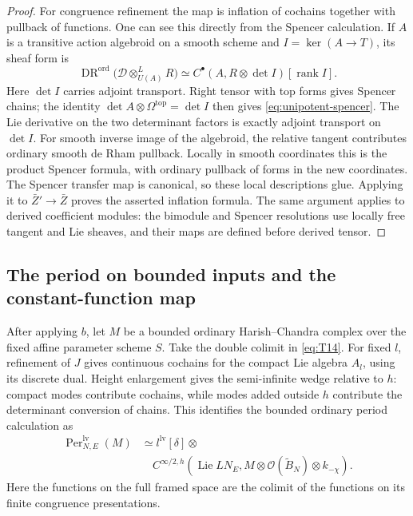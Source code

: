 \documentclass[11pt]{article}
\numberwithin{equation}{section}
\theoremstyle{definition}
\theoremstyle{remark}
\begin{document}
\begin{proof}
For congruence refinement the map is inflation of cochains together
with pullback of functions.  One can see this directly from the
Spencer calculation.  If $A$ is a transitive action algebroid on a
smooth scheme and $I=\ker(A\to T)$, its sheaf form is
\begin{equation}\label{eq:unipotent-spencer}
 \operatorname{DR}^{\mathrm{ord}}
   \bigl(\mathscr D\otimes^L_{U(A)}R\bigr)
 \simeq C^\bullet(A,R\otimes\det I)
                           [\operatorname{rank}I].
\end{equation}
Here $\det I$ carries adjoint transport.  Right tensor with top
forms gives Spencer chains; the identity
$\det A\otimes\Omega^{\mathrm{top}}=\det I$ then gives
\eqref{eq:unipotent-spencer}.  The Lie derivative on the two
determinant factors is exactly adjoint transport on $\det I$.
For smooth inverse image of the algebroid, the relative tangent
contributes ordinary smooth de Rham pullback.  Locally in smooth
coordinates this is the product Spencer formula, with ordinary
pullback of forms in the new coordinates.  The Spencer transfer
map is canonical, so these local descriptions glue.  Applying it
to $\bar Z'\to\bar Z$ proves the asserted inflation formula.
The same argument applies to derived coefficient modules: the
bimodule and Spencer resolutions use locally free tangent and Lie
sheaves, and their maps are defined before derived tensor.
\end{proof}

\subsection{The period on bounded inputs and the constant-function map}

After applying $b$, let $M$ be a bounded ordinary Harish--Chandra
complex over the fixed affine parameter scheme $S$.  Take the
double colimit in \eqref{eq:T14}.  For fixed $l$, refinement
of $J$ gives continuous cochains for the compact Lie algebra $A_l$,
using its discrete dual.  Height enlargement gives the semi-infinite
wedge relative to $h$: compact modes contribute cochains, while
modes added outside $h$ contribute the determinant conversion of
chains.  This identifies the bounded ordinary period calculation as
\begin{equation}\label{eq:unipotent-coefficient-period}
 \begin{aligned}
 \operatorname{Per}_{N,E}^{\mathrm{lv}}(M)
 &\simeq l^{\mathrm{lv}}[\delta]\otimes{}\\
 &\quad C^{\infty/2,h}\!\left(
   \operatorname{Lie}LN_E,
   M\otimes\mathcal O(\widetilde B_N)\otimes k_{-\chi}\right).
 \end{aligned}
\end{equation}
Here the functions on the full framed space are the colimit of the
functions on its finite congruence presentations.
\end{document}
